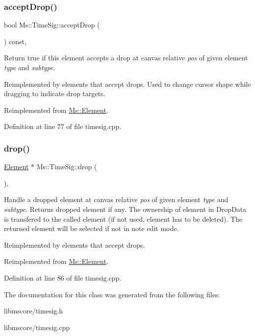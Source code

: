 \subsubsection{\texorpdfstring{accept\+Drop()}{acceptDrop()}}
{\footnotesize\ttfamily bool Ms\+::\+Time\+Sig\+::accept\+Drop (\begin{DoxyParamCaption}\item[{\hyperlink{class_ms_1_1_edit_data}{Edit\+Data} \&}]{ }\end{DoxyParamCaption}) const\hspace{0.3cm}{\ttfamily [override]}, {\ttfamily [virtual]}}

Return true if this element accepts a drop at canvas relative {\itshape pos} of given element {\itshape type} and {\itshape subtype}.

Reimplemented by elements that accept drops. Used to change cursor shape while dragging to indicate drop targets. 

Reimplemented from \hyperlink{class_ms_1_1_element_a35614445f0bc2212cbcc75c3f5810543}{Ms\+::\+Element}.



Definition at line 77 of file timesig.\+cpp.

\mbox{\label{class_ms_1_1_time_sig_a3d1b3e9783dd176c2e479ecf3e250e2a}} 
\subsubsection{\texorpdfstring{drop()}{drop()}}
{\footnotesize\ttfamily \hyperlink{class_ms_1_1_element}{Element} $\ast$ Ms\+::\+Time\+Sig\+::drop (\begin{DoxyParamCaption}\item[{\hyperlink{class_ms_1_1_edit_data}{Edit\+Data} \&}]{ }\end{DoxyParamCaption})\hspace{0.3cm}{\ttfamily [override]}, {\ttfamily [virtual]}}

Handle a dropped element at canvas relative {\itshape pos} of given element {\itshape type} and {\itshape subtype}. Returns dropped element if any. The ownership of element in Drop\+Data is transfered to the called element (if not used, element has to be deleted). The returned element will be selected if not in note edit mode.

Reimplemented by elements that accept drops. 

Reimplemented from \hyperlink{class_ms_1_1_element_a0ca69a9fb48e7b9fb481aacaf3860032}{Ms\+::\+Element}.



Definition at line 86 of file timesig.\+cpp.



The documentation for this class was generated from the following files\+:\begin{DoxyCompactItemize}
\item 
libmscore/timesig.\+h\item 
libmscore/timesig.\+cpp\end{DoxyCompactItemize}
